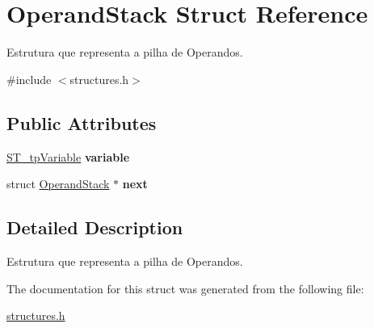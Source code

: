\hypertarget{structOperandStack}{}\section{Operand\+Stack Struct Reference}
\label{structOperandStack}


Estrutura que representa a pilha de Operandos.  




{\ttfamily \#include $<$structures.\+h$>$}

\subsection*{Public Attributes}
\begin{DoxyCompactItemize}
\item 
\mbox{\label{structOperandStack_a180f1a63424051a9a613305daa42e623}} 
\mbox{\hyperlink{structVariable}{S\+T\+\_\+tp\+Variable}} {\bfseries variable}
\item 
\mbox{\label{structOperandStack_a6ebcd214896350aa3c1e300ab5ea6f8e}} 
struct \mbox{\hyperlink{structOperandStack}{Operand\+Stack}} $\ast$ {\bfseries next}
\end{DoxyCompactItemize}


\subsection{Detailed Description}
Estrutura que representa a pilha de Operandos. 

The documentation for this struct was generated from the following file\+:\begin{DoxyCompactItemize}
\item 
\mbox{\hyperlink{structures_8h}{structures.\+h}}\end{DoxyCompactItemize}
